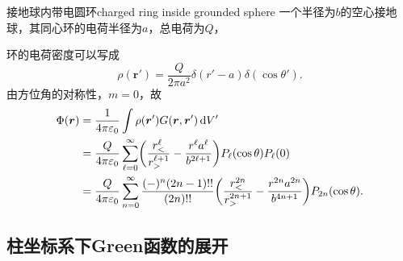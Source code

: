 \begin{example}{接地球内带电圆环}{charged ring inside grounded sphere}
    一个半径为$b$的空心接地球，其同心环的电荷半径为$a$，总电荷为$Q$，

    环的电荷密度可以写成
    \[
        \rho(\bm r') = \frac Q{2\pi a^2}\delta(r' - a)\delta(\cos\theta').
    \]
    由方位角的对称性，$m = 0$，故
    \begin{align*}
        \Phi(\bm r) &= \frac1{4\pi\varepsilon_0}\int\rho(\bm r')G(\bm r,\bm r')\mathop{}\!\mathrm{d} V'\\
        &= \frac Q{4\pi\varepsilon_0}\sum_{\ell=0}^\infty\biggl(\frac{r_<^\ell}{r_>^{\ell+1}} - \frac{r^\ell a^\ell}{b^{2\ell+1}}\biggr)P_\ell(\cos\theta)P_\ell(0)\\
        &= \frac Q{4\pi\varepsilon_0}\sum_{n=0}^\infty\frac{(-)^n(2n - 1)!!}{(2n)!!}\biggl(\frac{r_<^{2n}}{r_>^{2n+1}} - \frac{r^{2n}a^{2n}}{b^{4n+1}}\biggr)P_{2n}(\cos\theta).
    \end{align*}
\end{example}

\subsection{柱坐标系下Green函数的展开}
\label{ssec: Green expansion in cylindrical coordinate}

